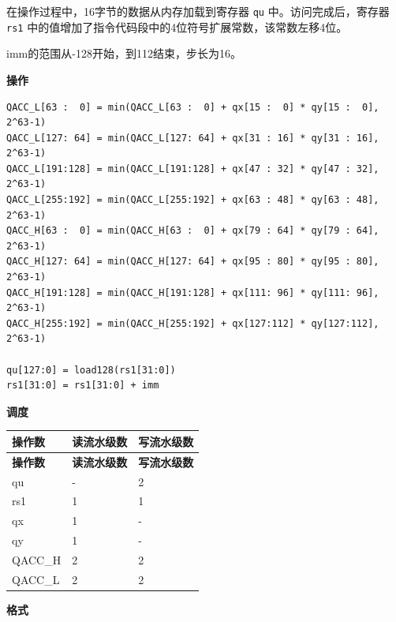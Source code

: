在操作过程中，16字节的数据从内存加载到寄存器 \lstinline{qu} 中。访问完成后，寄存器 \lstinline{rs1} 中的值增加了指令代码段中的4位符号扩展常数，该常数左移4位。

imm的范围从-128开始，到112结束，步长为16。

\textbf{操作}\\
\begin{lstlisting}
QACC_L[63 :  0] = min(QACC_L[63 :  0] + qx[15 :  0] * qy[15 :  0], 2^63-1)
QACC_L[127: 64] = min(QACC_L[127: 64] + qx[31 : 16] * qy[31 : 16], 2^63-1)
QACC_L[191:128] = min(QACC_L[191:128] + qx[47 : 32] * qy[47 : 32], 2^63-1)
QACC_L[255:192] = min(QACC_L[255:192] + qx[63 : 48] * qy[63 : 48], 2^63-1)
QACC_H[63 :  0] = min(QACC_H[63 :  0] + qx[79 : 64] * qy[79 : 64], 2^63-1)
QACC_H[127: 64] = min(QACC_H[127: 64] + qx[95 : 80] * qy[95 : 80], 2^63-1)
QACC_H[191:128] = min(QACC_H[191:128] + qx[111: 96] * qy[111: 96], 2^63-1)
QACC_H[255:192] = min(QACC_H[255:192] + qx[127:112] * qy[127:112], 2^63-1)

qu[127:0] = load128(rs1[31:0])
rs1[31:0] = rs1[31:0] + imm
\end{lstlisting}

\textbf{调度}\\
\begin{longtable}[c]{|l|l|l|}
    \hline
    \rowcolor{lightgray}
    \textbf{操作数} & \textbf{读流水级数} & \textbf{写流水级数} \\\hline
    \endfirsthead
    \hline
    \rowcolor{lightgray}
     \textbf{操作数} & \textbf{读流水级数} & \textbf{写流水级数} \\\hline
    \endhead
    \hline
    \endfoot

    qu & - & 2 \\\hline
    rs1 & 1 & 1 \\\hline
     qx & 1 & - \\\hline
     qy & 1 & - \\\hline
     QACC\_H & 2 & 2 \\\hline
     QACC\_L & 2 & 2

\end{longtable}

\textbf{格式}\\

